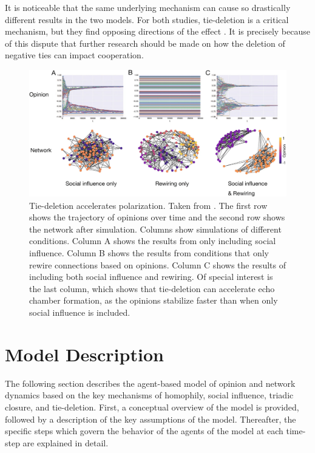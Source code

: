 \documentclass[11pt]{article}
\begin{document}
\noindent It is noticeable that the same underlying mechanism can cause so drastically different results in the two models. For both studies, tie-deletion is a critical mechanism, but they find opposing directions of the effect \cite{santos_cooperation_2006,sasahara_social_2021}. It is precisely because of this dispute that further research should be made on how the deletion of negative ties can impact cooperation.

\begin{figure}[H]
   \centering
   \includegraphics[width=.8\linewidth]{../plots/references/echo_chambers.png}
 \caption{Tie-deletion accelerates polarization. Taken from \protect{}. The first row shows the trajectory of opinions over time and the second row shows the network after simulation. Columns show simulations of different conditions. Column A shows the results from only including social influence. Column B shows the results from conditions that only rewire connections based on opinions. Column C shows the results of including both social influence and rewiring. Of special interest is the last column, which shows that tie-deletion can accelerate echo chamber formation, as the opinions stabilize faster than when only social influence is included.}
 \label{fig:echo_chambers}
\end{figure}

\section{Model Description}
The following section describes the agent-based model of opinion and network dynamics based on the key mechanisms of homophily, social influence, triadic closure, and tie-deletion. First, a conceptual overview of the model is provided, followed by a description of the key assumptions of the model. Thereafter, the specific steps which govern the behavior of the agents of the model at each time-step are explained in detail. 
\end{document}
